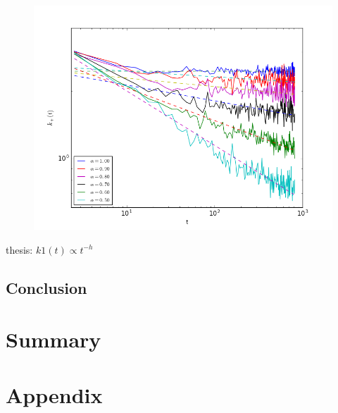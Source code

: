 \documentclass[
  a4paper,BCOR10mm,oneside,
  bibtotoc,idxtotoc,
  headsepline,footsepline,%
  fleqn,openbib
]{scrbook}
\begin{document}
\begin{figure}[h!]
  \centering
  \includegraphics[width=\textwidth]{./data/k1_fordifferentalpha_withfit.png}
  \captionsetup{width=\linewidth}
  \label{fig:k1differentalphawithfit}
\end{figure}

thesis: $k1(t)\propto t^{-h}$

\section{Conclusion}
\chapter{Summary}
\chapter{Appendix}
\end{document}
